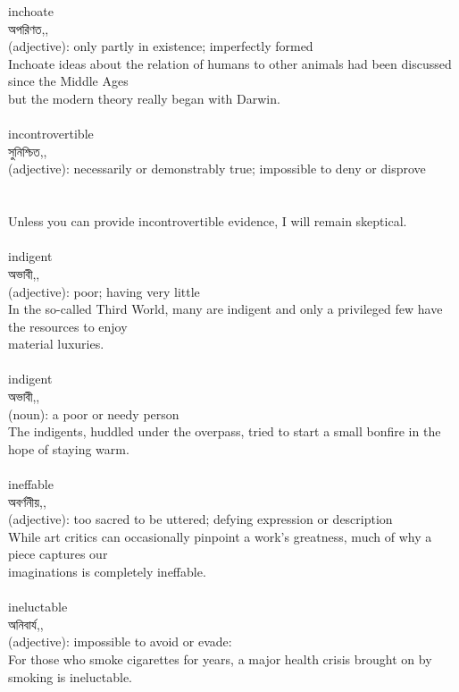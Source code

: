 \documentclass{article}
\begin{document}
{{inchoate}\\
{অপরিণত,,}\\
{(adjective): only partly in existence; imperfectly formed\\Inchoate ideas about the relation of humans to other animals had been discussed since the Middle Ages\\but the modern theory really began with Darwin.\\}\\
{incontrovertible}\\
{সুনিশ্চিত,,}\\
{(adjective): necessarily or demonstrably true; impossible to deny or disprove\\\\                                                                                \\Unless you can provide incontrovertible evidence, I will remain skeptical.\\}\\
{indigent}\\
{অভাবী,,}\\
{(adjective): poor; having very little\\In the so-called Third World, many are indigent and only a privileged few have the resources to enjoy\\material luxuries.\\}\\
{indigent}\\
{অভাবী,,}\\
{(noun): a poor or needy person\\The indigents, huddled under the overpass, tried to start a small bonfire in the hope of staying warm.\\}\\
{ineffable}\\
{অবর্ণনীয়,,}\\
{(adjective): too sacred to be uttered; defying expression or description\\While art critics can occasionally pinpoint a work's greatness, much of why a piece captures our\\imaginations is completely ineffable.\\}\\
{ineluctable}\\
{অনিবার্য,,}\\
{(adjective): impossible to avoid or evade:\\For those who smoke cigarettes for years, a major health crisis brought on by smoking is ineluctable.\\}\\
}
\end{document}
